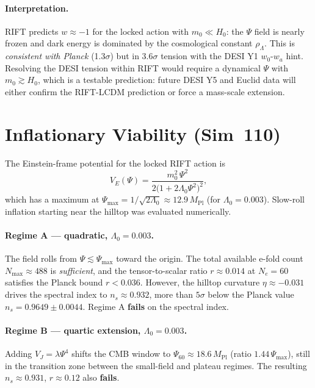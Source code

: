 \documentclass[12pt,a4paper]{article}
\begin{document}
\paragraph{Interpretation.}
RIFT predicts $w\approx-1$ for the locked action with $m_0\ll H_0$:
the $\Psi$ field is nearly frozen and dark energy is dominated by the
cosmological constant $\rho_\Lambda$.  This is \emph{consistent with
Planck} (1.3$\sigma$) but in 3.6$\sigma$ tension with the DESI Y1
$w_0$-$w_a$ hint.  Resolving the DESI tension within RIFT would require
a dynamical $\Psi$ with $m_0\gtrsim H_0$, which is a testable
prediction: future DESI Y5 and Euclid data will either confirm the
RIFT-LCDM prediction or force a mass-scale extension.

\section{Inflationary Viability (Sim~110)}
\label{sec:sim110}

The Einstein-frame potential for the locked RIFT action is
\begin{equation}
V_E(\Psi) = \frac{m_0^2\,\Psi^2}{2\bigl(1+2\Lambda_0\Psi^2\bigr)^2},
\end{equation}
which has a maximum at $\Psi_\mathrm{max}=1/\sqrt{2\Lambda_0}\approx12.9\,M_\mathrm{Pl}$
(for $\Lambda_0=0.003$). Slow-roll inflation starting near the hilltop was evaluated
numerically.

\paragraph{Regime A — quadratic, $\Lambda_0=0.003$.}
The field rolls from $\Psi\lesssim\Psi_\mathrm{max}$ toward the origin.
The total available e-fold count $N_\mathrm{max}\approx488$ is
\emph{sufficient}, and the tensor-to-scalar ratio $r\approx0.014$ at $N_e=60$
satisfies the Planck bound $r<0.036$.  However, the hilltop curvature
$\eta\approx-0.031$ drives the spectral index to $n_s\approx0.932$,
more than $5\sigma$ below the Planck value $n_s=0.9649\pm0.0044$.
Regime A \textbf{fails} on the spectral index.

\paragraph{Regime B — quartic extension, $\Lambda_0=0.003$.}
Adding $V_J=\lambda\Psi^4$ shifts the CMB window to $\Psi_{60}\approx18.6\,M_\mathrm{Pl}$
(ratio $1.44\,\Psi_\mathrm{max}$), still in the transition zone between the
small-field and plateau regimes.  The resulting $n_s\approx0.931$, $r\approx0.12$
also \textbf{fails}.
\end{document}
